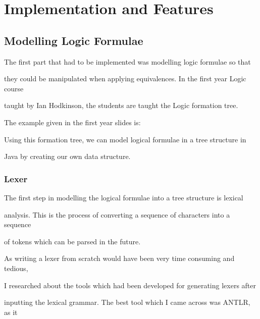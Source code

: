 \documentclass{report}
\begin{document}




\chapter{Implementation and Features}



\section{Modelling Logic Formulae}



The first part that had to be implemented was modelling logic formulae so that

they could be manipulated when applying equivalences. In the first year Logic course

taught by Ian Hodkinson, the students are taught the Logic formation tree.



The example given in the first year slides is:




Using this formation tree, we can model logical formulae in a tree structure in

Java by creating our own data structure.



\subsection{Lexer}



The first step in modelling the logical formulae into a tree structure is lexical 

analysis. This is the process of converting a sequence of characters into a sequence

of tokens which can be parsed in the future.



As writing a lexer from scratch would have been very time consuming and tedious,

I researched about the tools which had been developed for generating lexers after

inputting the lexical grammar. The best tool which I came across was ANTLR, as it
\end{document}
